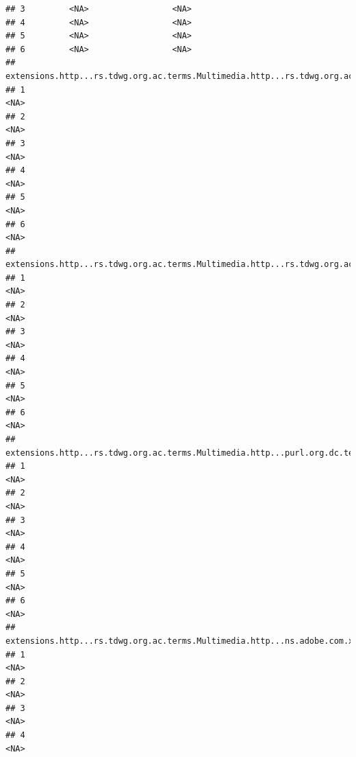 \documentclass[
]{book}
\begin{document}
\begin{verbatim}
## 3         <NA>                 <NA>
## 4         <NA>                 <NA>
## 5         <NA>                 <NA>
## 6         <NA>                 <NA>
##   extensions.http...rs.tdwg.org.ac.terms.Multimedia.http...rs.tdwg.org.ac.terms.variantLiteral.1
## 1                                                                                           <NA>
## 2                                                                                           <NA>
## 3                                                                                           <NA>
## 4                                                                                           <NA>
## 5                                                                                           <NA>
## 6                                                                                           <NA>
##   extensions.http...rs.tdwg.org.ac.terms.Multimedia.http...rs.tdwg.org.ac.terms.variantLiteral.2
## 1                                                                                           <NA>
## 2                                                                                           <NA>
## 3                                                                                           <NA>
## 4                                                                                           <NA>
## 5                                                                                           <NA>
## 6                                                                                           <NA>
##   extensions.http...rs.tdwg.org.ac.terms.Multimedia.http...purl.org.dc.terms.identifier.3
## 1                                                                                    <NA>
## 2                                                                                    <NA>
## 3                                                                                    <NA>
## 4                                                                                    <NA>
## 5                                                                                    <NA>
## 6                                                                                    <NA>
##   extensions.http...rs.tdwg.org.ac.terms.Multimedia.http...ns.adobe.com.xap.1.0.rights.Owner.3
## 1                                                                                         <NA>
## 2                                                                                         <NA>
## 3                                                                                         <NA>
## 4                                                                                         <NA>

\end{verbatim}
\end{document}
